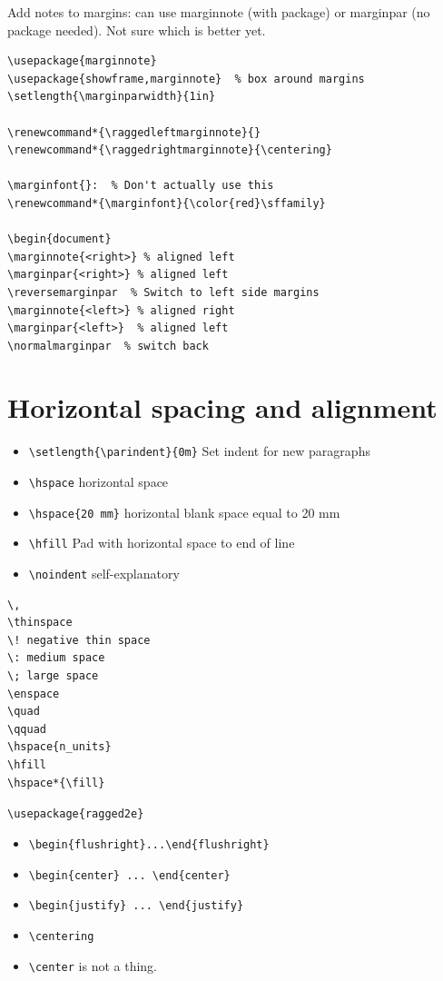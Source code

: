 \documentclass{article}
\begin{document}
Add notes to margins: can use marginnote (with package) or marginpar
(no package needed). Not sure which is better yet.
\begin{lstlisting}
\usepackage{marginnote}
\usepackage{showframe,marginnote}  % box around margins
\setlength{\marginparwidth}{1in}

\renewcommand*{\raggedleftmarginnote}{}
\renewcommand*{\raggedrightmarginnote}{\centering}

\marginfont{}:  % Don't actually use this
\renewcommand*{\marginfont}{\color{red}\sffamily}

\begin{document}
\marginnote{<right>} % aligned left
\marginpar{<right>} % aligned left
\reversemarginpar  % Switch to left side margins
\marginnote{<left>} % aligned right
\marginpar{<left>}  % aligned left
\normalmarginpar  % switch back
\end{lstlisting}

\section{Horizontal spacing and alignment}
\begin{itemize}
    \item \verb|\setlength{\parindent}{0m}| Set indent for new paragraphs
    \item \verb|\hspace| horizontal space
    \item \verb|\hspace{20 mm}| horizontal blank space equal to 20 mm
    \item \verb|\hfill| Pad with horizontal space to end of line
    \item \verb|\noindent| self-explanatory
\end{itemize}

\begin{verbatim}
\,
\thinspace
\! negative thin space
\: medium space
\; large space
\enspace
\quad
\qquad
\hspace{n_units}
\hfill
\hspace*{\fill}
\end{verbatim}

\verb|\usepackage{ragged2e}|
\begin{itemize}
    \item \verb|\begin{flushright}...\end{flushright}|
    \item \verb|\begin{center} ... \end{center}|
    \item \verb|\begin{justify} ... \end{justify}|
    \item \verb|\centering|
    \item \verb|\center| is not a thing.
\end{itemize}
\end{document}
